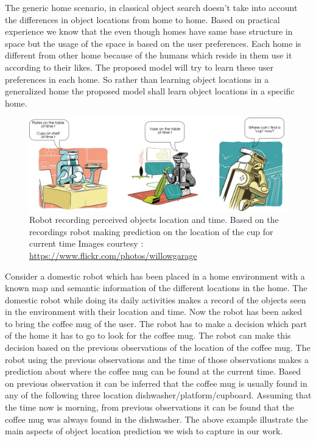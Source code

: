 The generic home scenario, in classical object search doesn't take into account the differences in object locations from home to home. Based on practical experience we know that the even though homes have same base structure in space but the usage of the space is based on the user preferences. Each home is different from other home because of the humans which reside in them use it according to their likes. The proposed model will try to learn these user preferences in each home. So rather than learning object locations in a generalized home the proposed model shall learn object locations in a specific home.




\begin{figure}[htp]
\centering
\includegraphics[scale=0.4]{pictures/scenario.png}
\caption{Robot recording perceived objects location and time. Based on the
recordings robot making prediction on the location of the cup for current time
Images courtesy : \url{https://www.flickr.com/photos/willowgarage} }
\label{scenario}
\end{figure}

Consider a domestic robot which has been placed in a home environment with a known map
and semantic information of the different locations in the home. The domestic robot while doing its daily activities 
makes a record of the objects seen in the environment with
their location and time. Now the robot has been asked to bring the coffee mug
of the user.
The robot has to make a decision which part of the home it has to go to look for
the coffee mug.
The robot can make this decision based on the previous observations of the 
location of the coffee mug.
The robot using the previous observations and the time of those observations 
makes a prediction about where the coffee mug can be found at the current time.
Based on previous observation it can be
inferred that the coffee mug is usually found in any of the following three location
dishwasher/platform/cupboard. Assuming that the time now is morning, from
previous observations it can be found that the coffee mug was always found  in the
dishwasher. The above example illustrate the main aspects of object location
prediction we wish to capture in our work.


